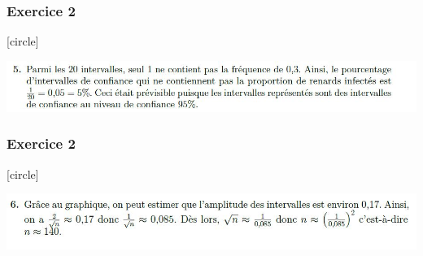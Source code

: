 \documentclass{beamer}
\begin{document}
\begin{frame}
\frametitle{Exercice 2}
[circle]

\includegraphics[scale=0.45]{conf5.jpg}
\end{frame}

\begin{frame}
\frametitle{Exercice 2}
[circle]

\includegraphics[scale=0.45]{conf6.jpg}
\end{frame}
\end{document}
